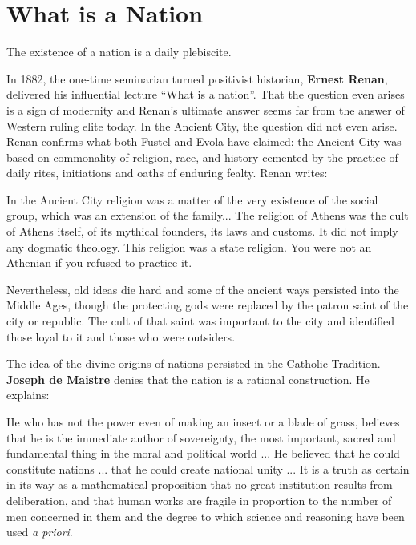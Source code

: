 \section{What is a Nation}

\begin{quotex}
The existence of a nation is a daily plebiscite.
\end{quotex}


In 1882, the one-time seminarian turned positivist historian, \textbf{Ernest Renan}, delivered his influential lecture ``What is a nation''. That the question even arises is a sign of modernity and Renan's ultimate answer seems far from the answer of Western ruling elite today. In the Ancient City, the question did not even arise. Renan confirms what both Fustel and Evola have claimed: the Ancient City was based on commonality of religion, race, and history cemented by the practice of daily rites, initiations and oaths of enduring fealty. Renan writes:

\begin{quotex} In the Ancient City religion was a matter of the very existence of the social group, which was an extension of the family... The religion of Athens was the cult of Athens itself, of its mythical founders, its laws and customs. It did not imply any dogmatic theology. This religion was a state religion. You were not an Athenian if you refused to practice it.
\end{quotex}


Nevertheless, old ideas die hard and some of the ancient ways persisted into the Middle Ages, though the protecting gods were replaced by the patron saint of the city or republic. The cult of that saint was important to the city and identified those loyal to it and those who were outsiders.

The idea of the divine origins of nations persisted in the Catholic Tradition. \textbf{Joseph de Maistre} denies that the nation is a rational construction. He explains:

\begin{quotex}
He who has not the power even of making an insect or a blade of grass, believes that he is the immediate author of sovereignty, the most important, sacred and fundamental thing in the moral and political world ... He believed that he could constitute nations ... that he could create national unity ... It is a truth as certain in its way as a mathematical proposition that no great institution results from deliberation, and that human works are fragile in proportion to the number of men concerned in them and the degree to which science and reasoning have been used \emph{a priori}.
\end{quotex}


